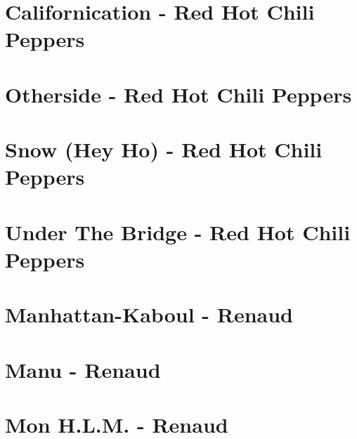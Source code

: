 \documentclass{guitartabs}
\begin{document}
\section*{Californication - Red Hot Chili Peppers}
\begin{guitar}

\end{guitar}

\section*{Otherside - Red Hot Chili Peppers}
\begin{guitar}

\end{guitar}

\section{Snow  (Hey Ho) - Red Hot Chili Peppers}
\begin{guitar}

\end{guitar}

\section*{Under The Bridge - Red Hot Chili Peppers}
\begin{guitar}

\end{guitar}



\section{Manhattan-Kaboul - Renaud}
\begin{guitar}

\end{guitar}

\section{Manu - Renaud}
\begin{guitar}

\end{guitar}

\section*{Mon H.L.M. - Renaud}
\begin{guitar}

\end{guitar}
\end{document}
